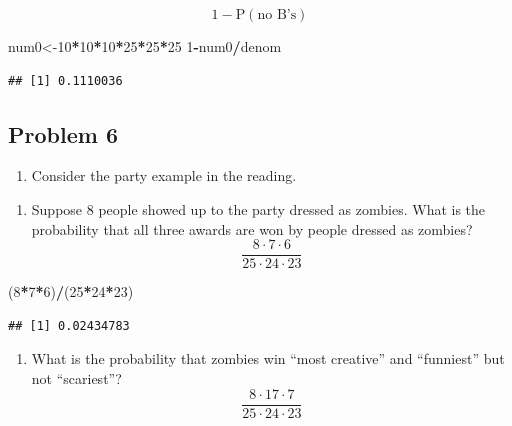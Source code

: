 \documentclass[
]{book}
\newenvironment{Shaded}{\begin{snugshade}}{\end{snugshade}}
\newcommand{\DecValTok}[1]{\textcolor[rgb]{0.00,0.00,0.81}{#1}}
\newcommand{\NormalTok}[1]{#1}
\newcommand{\OperatorTok}[1]{\textcolor[rgb]{0.81,0.36,0.00}{\textbf{#1}}}
\providecommand{\tightlist}{%
  \setlength{\itemsep}{0pt}\setlength{\parskip}{0pt}}
\begin{document}
\[
1-\mbox{P}(\mbox{no B's})
\]

\begin{Shaded}
\begin{Highlighting}[]
\NormalTok{num0<-}\DecValTok{10}\OperatorTok{*}\DecValTok{10}\OperatorTok{*}\DecValTok{10}\OperatorTok{*}\DecValTok{25}\OperatorTok{*}\DecValTok{25}\OperatorTok{*}\DecValTok{25}
\DecValTok{1}\OperatorTok{-}\NormalTok{num0}\OperatorTok{/}\NormalTok{denom}
\end{Highlighting}
\end{Shaded}

\begin{verbatim}
## [1] 0.1110036
\end{verbatim}

\hypertarget{problem-6}{%
\subsection{Problem 6}\label{problem-6}}

\begin{enumerate}
\def\labelenumi{\arabic{enumi}.}
\setcounter{enumi}{5}
\tightlist
\item
  Consider the party example in the reading.
\end{enumerate}

\begin{enumerate}
\def\labelenumi{\alph{enumi}.}
\tightlist
\item
  Suppose 8 people showed up to the party dressed as zombies. What is the probability that all three awards are won by people dressed as zombies?
  \[
  \frac{8\cdot 7 \cdot 6}{25\cdot 24 \cdot 23}
  \]
\end{enumerate}

\begin{Shaded}
\begin{Highlighting}[]
\NormalTok{(}\DecValTok{8}\OperatorTok{*}\DecValTok{7}\OperatorTok{*}\DecValTok{6}\NormalTok{)}\OperatorTok{/}\NormalTok{(}\DecValTok{25}\OperatorTok{*}\DecValTok{24}\OperatorTok{*}\DecValTok{23}\NormalTok{)}
\end{Highlighting}
\end{Shaded}

\begin{verbatim}
## [1] 0.02434783
\end{verbatim}

\begin{enumerate}
\def\labelenumi{\alph{enumi}.}
\setcounter{enumi}{1}
\tightlist
\item
  What is the probability that zombies win ``most creative'' and ``funniest'' but not ``scariest''?
  \[
  \frac{8 \cdot 17 \cdot 7}{25 \cdot 24 \cdot 23}
  \]
\end{enumerate}
\end{document}
